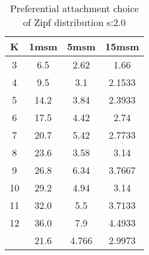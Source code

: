 \begin{table}[H]
\centering
\begin{tabular}{c|ccc}
K &1msm &5msm &15msm\\
\hline
3 & 6.5 & 2.62 & 1.66\\
4 & 9.5 & 3.1 & 2.1533\\
5 & 14.2 & 3.84 & 2.3933\\
6 & 17.5 & 4.42 & 2.74\\
7 & 20.7 & 5.42 & 2.7733\\
8 & 23.6 & 3.58 & 3.14\\
9 & 26.8 & 6.34 & 3.7667\\
10 & 29.2 & 4.94 & 3.14\\
11 & 32.0 & 5.5 & 3.7133\\
12 & 36.0 & 7.9 & 4.4933\\
\hline
& 21.6 & 4.766 & 2.9973\\
\end{tabular}
\caption{Preferential attachment choice of Zipf distribution s:2.0}
\label{tab:s2.0}
\end{table}
